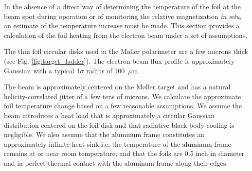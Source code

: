 \documentclass[preprint,12pt]{elsarticle}
\begin{document}
In the absence of a direct way of determining the temperature of the foil at the beam spot during operation or of monitoring the relative magnetization {\it in situ}, an estimate of the temperature increase must be made. This section provides a calculation of the foil heating from the electron beam under a set of assumptions.

The thin foil circular disks used in the M\o ller polarimeter are a few microns thick (see Fig. \ref{fig:target_ladder}). The electron beam flux profile is approximately Gaussian with a typical 1$\sigma$ radius of 100~$\mu$m. 

The beam is approximately centered on the M\o ller target and has a natural helicity-correlated jitter of a few tens of microns. We calculate the approximate foil temperature change based on a few reasonable assumptions. We assume the beam introduces a heat load that is approximately a circular Gaussian distribution centered on the foil disk and that radiative black-body cooling is negligible. We also assume that the aluminum frame constitutes an approximately infinite heat sink i.e. the temperature of the aluminum frame remains at or near room temperature, and that the foils are 0.5 inch in diameter and in perfect thermal contact with the aluminum frame along their edges.
\end{document}
